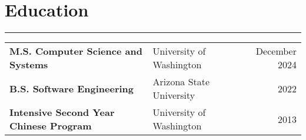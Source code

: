 \documentclass[letterpaper,11pt]{article}
\begin{document}
\vspace{-10px}
\section*{Education}
\hrule
\begin{tabularx}{\linewidth}{@{}XXr@{}}
  \textbf{M.S. Computer Science and Systems}     & University of Washington & December 2024 \\
  \textbf{B.S. Software Engineering}             & Arizona State University & 2022          \\
  \textbf{Intensive Second Year Chinese Program} & University of Washington & 2013          \\
\end{tabularx}
\end{document}
